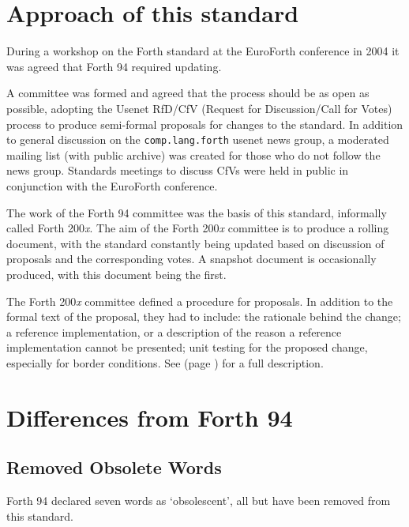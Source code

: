 \section{Approach of this standard} %
\label{diff:approach}

During a workshop on the Forth standard at the EuroForth conference in
2004 it was agreed that Forth 94 required updating.

A committee was formed and agreed that the process should be as open
as possible, adopting the Usenet RfD/CfV (Request for Discussion/Call
for Votes) process to produce semi-formal proposals for changes to the
standard.  In addition to general discussion on the \texttt{comp.lang.forth}
usenet news group, a moderated mailing list (with public archive) was
created for those who do not follow the news group.
Standards meetings to discuss CfVs were held in public in
conjunction with the EuroForth conference.

The work of the Forth 94 committee was the basis of this standard,
informally called Forth 200\emph{x}.  The aim of the Forth 200\emph{x}
committee is to produce a rolling document, with the standard constantly
being updated based on discussion of proposals and the corresponding
votes.  A snapshot document is occasionally produced, with this document
being the first.

The Forth 200\emph{x} committee defined a procedure for proposals.  In
addition to the formal text of the proposal, they had to include:
the rationale behind the change;
a reference implementation, or a description of the reason a reference
implementation cannot be presented;
unit testing for the proposed change, especially for border conditions.
See  (page \pageref{process}) for a full description.


\section{Differences from Forth 94} %
\label{diff:forth94}

\subsection{Removed Obsolete Words} %
\label{diff:ans:obsolete}

Forth 94 declared seven words as `obsolescent', all but
 have been removed from this standard.

